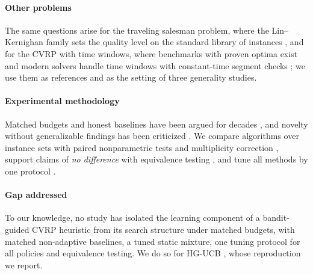 \paragraph{Other problems} The same questions arise for the traveling salesman problem, where the Lin--Kernighan family sets the quality level \citep{helsgaun2000} on the standard library of instances \citep{reinelt1991}, and for the CVRP with time windows, where benchmarks with proven optima exist \citep{solomon1987} and modern solvers handle time windows with constant-time segment checks \citep{vidal2013,wouda2024}; we use them as references and as the setting of three generality studies.

\paragraph{Experimental methodology}
Matched budgets and honest baselines have been argued for decades \citep{hooker1995,barr1995}, and novelty without generalizable findings has been criticized \citep{sorensen2015}. We compare algorithms over instance sets with paired nonparametric tests and multiplicity correction \citep{wilcoxon1945,holm1979,derrac2011}, support claims of \emph{no difference} with equivalence testing \citep{lakens2017}, and tune all methods by one protocol \citep{lopezibanez2016}.

\paragraph{Gap addressed}
To our knowledge, no study has isolated the learning component of a bandit-guided CVRP heuristic from its search structure under matched budgets, with matched non-adaptive baselines, a tuned static mixture, one tuning protocol for all policies and equivalence testing. We do so for HG-UCB \citep{kalatzantonakis2023}, whose reproduction we report.
